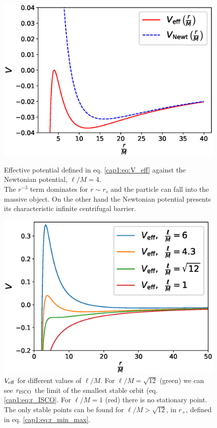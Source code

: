 \begin{figure}[h]
\begin{minipage}{0.49 \textwidth}
    \centering
    \includegraphics[width = \textwidth]{Figures/V_eff.eps}
    \caption{Effective potential defined in eq. \ref{cap1:eq:V_eff} against the
    Newtonian potential, $\ell / M = 4$. \\
    The $r^{-3}$ term dominates for $r \sim r_s$ and the
    particle can fall into the massive object.
    On the other hand the Newtonian potential presents its characteristic
    infinite centrifugal barrier.}
    \label{cap1:fig:V_effvsVN}
\end{minipage}
\hspace{0.009 \textwidth}
\begin{minipage}{0.49 \textwidth}
    \centering
    \includegraphics[width = \textwidth]{Figures/V_eff_tanti.eps}
    \caption{$V_{\rm eff}$ for different values of $\ell / M$.
    For $\ell / M = \sqrt{12}$ (green) we can see $r_{\rm ISCO}$
    the limit of the smallest stable orbit (eq. \ref{cap1:eq:r_ISCO}.
    For $\ell / M = 1$ (red) there is no stationary point.
    The only stable points can be found for $\ell / M > \sqrt{12}$,
    in $r_+$, defined in eq. \ref{cap1:eq:r_min_max}.}
    \label{cap1:fig:V_eff_tanti}
\end{minipage}
\end{figure}

